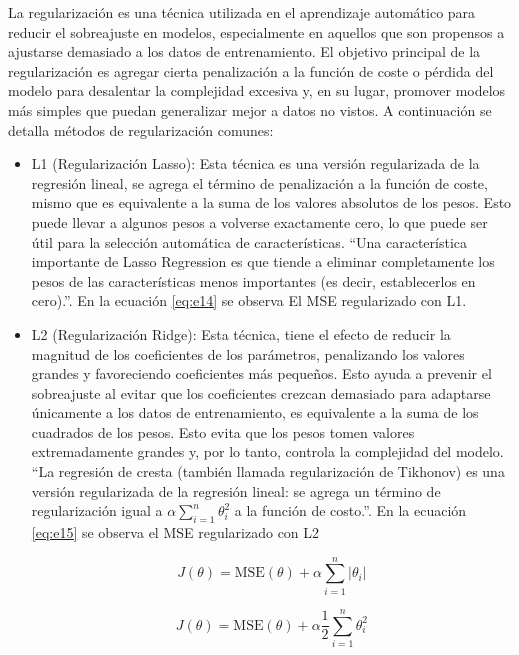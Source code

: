 La regularización es una técnica utilizada en el aprendizaje automático para reducir el sobreajuste en modelos, especialmente en aquellos que son propensos a ajustarse demasiado a los datos de entrenamiento.
El objetivo principal de la regularización es agregar cierta penalización a la función de coste o pérdida del modelo para desalentar la complejidad excesiva y, en su lugar, promover modelos más simples que puedan generalizar mejor a datos no vistos. A continuación se detalla métodos de regularización comunes:

\begin{itemize}
	\item L1 (Regularización Lasso): Esta técnica es una versión regularizada de la regresión lineal, se agrega el término de penalización a la función de coste, mismo que  es equivalente a la suma de los valores absolutos de los pesos. Esto puede llevar a algunos pesos a volverse exactamente cero, lo que puede ser útil para la selección automática de características. ``Una característica importante de Lasso Regression es que tiende a eliminar completamente los pesos de las características menos importantes (es decir, establecerlos en cero).''\cite[p. 140]{geron2019hands}. En la ecuación \ref{eq:e14} se observa  El MSE regularizado con L1.
	
	\item L2 (Regularización Ridge): Esta técnica, tiene el efecto de reducir la magnitud de los coeficientes de los parámetros, penalizando los valores grandes y favoreciendo coeficientes más pequeños. Esto ayuda a prevenir el sobreajuste al evitar que los coeficientes crezcan demasiado para adaptarse únicamente a los datos de entrenamiento, es equivalente a la suma de los cuadrados de los pesos. Esto evita que los pesos tomen valores extremadamente grandes y, por lo tanto, controla la complejidad del modelo. ``La regresión de cresta (también llamada regularización de Tikhonov) es una versión regularizada de la regresión lineal: se agrega un término de regularización igual a $ \alpha\sum_{i=1}^{n}  \theta_i^2$ a la función de costo.''\cite[p. 137]{geron2019hands}. En la ecuación \ref{eq:e15} se observa el MSE regularizado con L2
	
\begin{equation} \label{eq:e14} 
	J(\theta) = \text{MSE}(\theta) + \alpha\sum_{i=1}^{n} \left |  \theta_i \right |
\end{equation}

\begin{equation} \label{eq:e15} 
	J(\theta) = \text{MSE}(\theta) + \alpha\frac{1}{2}\sum_{i=1}^{n} \theta_i^2 
\end{equation}									
				

\end{itemize}
